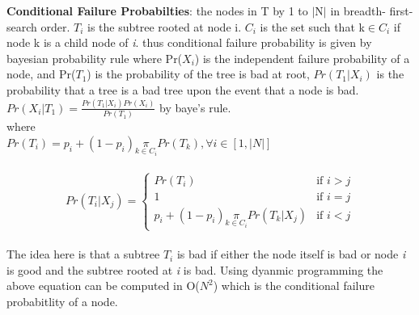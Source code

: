 \documentclass[10pt]{sigplan-proc-varsize}
\begin{document}
{\bf Conditional Failure Probabilties}: the nodes in T by 1 to $|$N$|$ in breadth- first-search order. $T_i$ is the subtree rooted at node i. $C_i$ is the set such that k$\in$$C_i$ if node k is a   child node of {\it i}. thus conditional failure probability is given by bayesian probability rule where Pr($X_i$) is the independent failure probability of a node, and Pr($T_1$) is the probability of the tree is bad at root, $Pr(T_1|X_i)$ is the probability that a tree is a bad tree upon the event that a node is bad. \\
$Pr(X_i|T_1) = \frac{Pr(T_1|X_i)Pr(X_i)}{Pr(T_1)}$ by baye's rule.\\
where\\
$Pr(T_i) = p_i+(1-p_i) \underset{k{\in}C_i}{\pi}Pr(T_k) , \forall i \in [1,|N|]$\\
\\

\[
 Pr(T_i|X_j) =
  \begin{cases}
   Pr(T_i) & \text{if } i > j \\
   1       & \text{if } i=j \\
   p_i+(1-p_i)  \underset{k{\in}C_i}{\pi} Pr(T_k|X_j)  & \text{if } i<j
  \end{cases}
\] \\

The idea here is that a subtree $T_i$ is bad if either the node itself is bad or node {\it i} is good and the subtree rooted at {\it i} is bad. Using dyanmic programming the above equation can be computed in O($N^2$) which is the conditional failure probabitlity of a node. 
\end{document}
